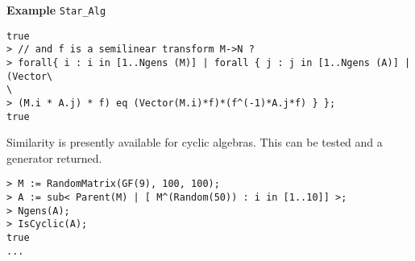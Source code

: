 \begin{framed}{\bf Example} {\tt Star\_Alg}
{\begin{lstlisting}[frame=single,basicstyle=\ttfamily\color{black!30!
teal},backgroundcolor=\color{white!70!gray}]
true
> // and f is a semilinear transform M->N ?
> forall{ i : i in [1..Ngens (M)] | forall { j : j in [1..Ngens (A)] | (Vector\
\
> (M.i * A.j) * f) eq (Vector(M.i)*f)*(f^(-1)*A.j*f) } };
true
\end{lstlisting}
Similarity is presently available for cyclic algebras.  This can be tested and
a generator returned.
\begin{lstlisting}[frame=single,basicstyle=\ttfamily\color{black!30!
teal},backgroundcolor=\color{white!70!gray}]
> M := RandomMatrix(GF(9), 100, 100);
> A := sub< Parent(M) | [ M^(Random(50)) : i in [1..10]] >;
> Ngens(A);
> IsCyclic(A);
true
...
\end{lstlisting}
}
\end{framed}

